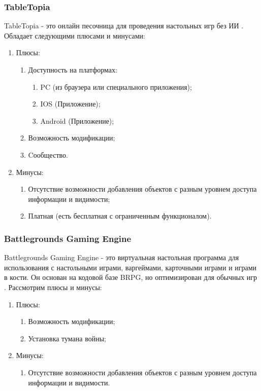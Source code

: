 	\subsubsection{TableTopia}
	
	TableTopia - это онлайн песочница для проведения настольных игр без ИИ \cite{4}. Обладает следующими плюсами и минусами:
	\begin{enumerate}
		\item Плюсы:
		\begin{enumerate}
			\item Доступность на платформах:
			\begin{enumerate}
				\item PC (из браузера или специального приложения);
				\item IOS (Приложение);
				\item Android (Приложение);
			\end{enumerate}
			\item Возможность модификации;
			\item Cообщество.
		\end{enumerate}
	
		\item Минусы:
		\begin{enumerate}
			\item Отсутствие возможности добавления объектов с разным уровнем доступа информации и видимости;
			\item Платная (есть бесплатная с ограниченным функционалом).
		\end{enumerate}
	\end{enumerate}
	
	\subsubsection{Battlegrounds Gaming Engine}
	
	Battlegrounds Gaming Engine - это виртуальная настольная программа для использования с настольными играми, варгеймами, карточными играми и играми в кости. Он основан на кодовой базе BRPG, но оптимизирован для обычных игр \cite{5}. Рассмотрим плюсы и минусы:
	
	\begin{enumerate}
		\item Плюсы:
		\begin{enumerate}
			\item Возможность модификации;
			\item Установка тумана войны;
		\end{enumerate}
		\item Минусы:
		\begin{enumerate}
			\item Отсутствие возможности добавления объектов с разным уровнем доступа информации и видимости.
		\end{enumerate}
	\end{enumerate}
	
